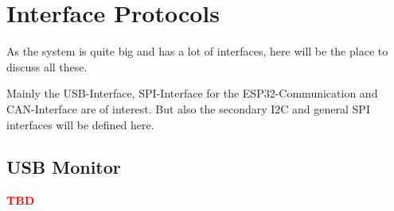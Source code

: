 \chapter{Interface Protocols}
As the system is quite big and has a lot of interfaces, here will be the place to discuss all these. 

Mainly the USB-Interface, SPI-Interface for the ESP32-Communication and CAN-Interface are of interest. But also the secondary I2C and general SPI interfaces will be defined here. 

\section{USB Monitor}
\textbf{\textcolor[HTML]{FF0000}{TBD}}
